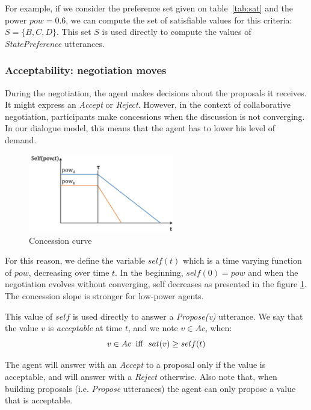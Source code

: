 \documentclass[sigconf]{aamas}  %
\begin{document}
	For example, if we consider the preference set given on table~\ref{tab:sat} and the power $pow=0.6$, we can compute the set of satisfiable values for this criteria: $S = \{B, C, D\}$. This set $S$ is used directly to compute the values of \emph{StatePreference} utterances.
	
	\subsubsection{Acceptability: negotiation moves}
	During the negotiation, the agent makes decisions about the proposals it receives. It might express an \emph{Accept} or \emph{Reject}. However, in the context of collaborative negotiation, participants make concessions when the discussion is not converging. In our dialogue model, this means that the agent has to lower his level of demand.
	
	\begin{figure}[t]
		\includegraphics[width=2.5in]{figs/sv3.png}
		\caption{\label{fig:conc}Concession curve}
	\end{figure} 
	
	For this reason, we define the variable $self(t)$ which is a time varying function of $pow$, decreasing over time $t$. In the beginning, $self(0) = pow$ and when the negotiation evolves without converging, self decreases as presented in the figure \ref{fig:conc}. The concession slope is stronger for low-power agents.
	
	This value of $self$ is used directly to answer a \emph{Propose(v)} utterance. We say that the value $v$ is \emph{acceptable} at time $t$, and we note $v \in Ac$, when:
	\begin{equation}
	v\in Ac\hspace{2mm}\mathrm{iff}\hspace{2mm}sat(v) \geq self(t)
	\end{equation}
	
	The agent will answer with an \emph{Accept} to a proposal only if the value is acceptable, and will answer with a \emph{Reject} otherwise. Also note that, when building proposals (i.e. \emph{Propose} utterances) the agent can only propose a value that is acceptable.
	
\end{document}
